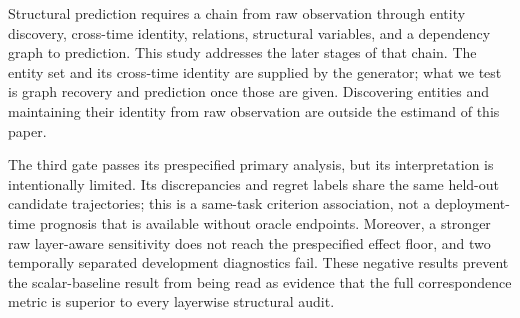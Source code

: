 Structural prediction requires a chain from raw observation through entity
discovery, cross-time identity, relations, structural variables, and a
dependency graph to prediction. This study addresses the later stages of that
chain. The entity set and its cross-time identity are supplied by the generator;
what we test is graph recovery and prediction once those are given. Discovering
entities and maintaining their identity from raw observation are outside the
estimand of this paper.

The third gate passes its prespecified primary analysis, but its interpretation
is intentionally limited.  Its discrepancies and regret labels share the same
held-out candidate trajectories; this is a same-task criterion association, not a
deployment-time prognosis that is available without oracle endpoints.
Moreover, a stronger raw layer-aware sensitivity does not reach the
prespecified effect floor, and two temporally separated development
diagnostics fail.  These negative results prevent the scalar-baseline result
from being read as evidence that the full correspondence metric is superior to
every layerwise structural audit.
